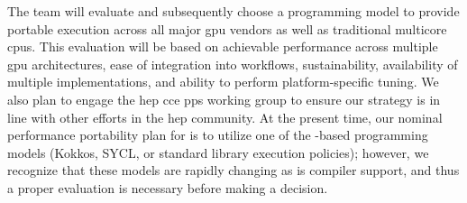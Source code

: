 The \celeritas team will evaluate and subsequently choose a programming model to
provide portable execution across all major \ac{gpu} vendors as well as
traditional multicore \acp{cpu}. This evaluation will be based on achievable
performance across multiple \ac{gpu} architectures, ease of integration into
\celeritas workflows, sustainability, availability of multiple implementations,
and ability to perform platform-specific tuning. We also plan to engage the
\ac{hep} \ac{cce} \ac{pps} working group to ensure our strategy is in line with
other efforts in the \ac{hep} community. At the present time, our nominal
performance portability plan for \celeritas is to utilize one of the \Cpp-based
programming models (Kokkos, SYCL, or \Cpp standard library execution policies);
however, we recognize that these models are rapidly changing as is compiler
support, and thus a proper evaluation is necessary before making a decision.
